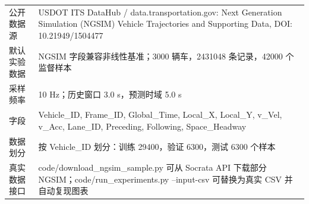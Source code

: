 \begin{tabularx}{\textwidth}{lX}
\toprule
公开数据源 & USDOT ITS DataHub / data.transportation.gov: Next Generation Simulation (NGSIM) Vehicle Trajectories and Supporting Data, DOI: 10.21949/1504477 \\ 
默认实验数据 & NGSIM 字段兼容非线性基准；3000 辆车，2431048 条记录，42000 个监督样本 \\ 
采样频率 & 10 Hz；历史窗口 3.0 s，预测时域 5.0 s \\ 
字段 & Vehicle\_ID, Frame\_ID, Global\_Time, Local\_X, Local\_Y, v\_Vel, v\_Acc, Lane\_ID, Preceding, Following, Space\_Headway \\ 
数据划分 & 按 Vehicle\_ID 划分：训练 29400，验证 6300，测试 6300 个样本 \\ 
真实数据接口 & code/download\_ngsim\_sample.py 可从 Socrata API 下载部分 NGSIM；code/run\_experiments.py --input-csv 可替换为真实 CSV 并自动复现图表 \\ 
\bottomrule
\end{tabularx}
